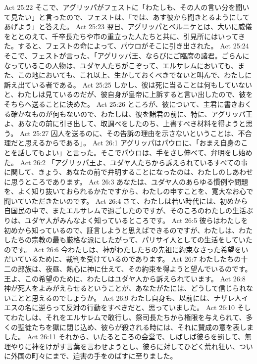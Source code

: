 Act 25:22  そこで、アグリッパがフェストに「わたしも、その人の言い分を聞いて見たい」と言ったので、フェストは、「では、あす彼から聞きとるようにしてあげよう」と答えた。
Act 25:23  翌日、アグリッパとベルニケとは、大いに威儀をととのえて、千卒長たちや市の重立った人たちと共に、引見所にはいってきた。すると、フェストの命によって、パウロがそこに引き出された。
Act 25:24  そこで、フェストが言った、「アグリッパ王、ならびにご臨席の諸君。ごらんになっているこの人物は、ユダヤ人たちがこぞって、エルサレムにおいても、また、この地においても、これ以上、生かしておくべきでないと叫んで、わたしに訴え出ている者である。
Act 25:25  しかし、彼は死に当ることは何もしていないと、わたしは見ているのだが、彼自身が皇帝に上訴すると言い出したので、彼をそちらへ送ることに決めた。
Act 25:26  ところが、彼について、主君に書きおくる確かなものが何もないので、わたしは、彼を諸君の前に、特に、アグリッパ王よ、あなたの前に引き出して、取調べをしたのち、上書すべき材料を得ようと思う。
Act 25:27  囚人を送るのに、その告訴の理由を示さないということは、不合理だと思えるからである」。
Act 26:1  アグリッパはパウロに、「おまえ自身のことを話してもよい」と言った。そこでパウロは、手をさし伸べて、弁明をし始めた。
Act 26:2  「アグリッパ王よ、ユダヤ人たちから訴えられているすべての事に関して、きょう、あなたの前で弁明することになったのは、わたしのしあわせに思うところであります。
Act 26:3  あなたは、ユダヤ人のあらゆる慣例や問題を、よく知り抜いておられるかたですから、わたしの申すことを、寛大なお心で聞いていただきたいのです。
Act 26:4  さて、わたしは若い時代には、初めから自国民の中で、またエルサレムで過ごしたのですが、そのころのわたしの生活ぶりは、ユダヤ人がみんなよく知っているところです。
Act 26:5  彼らはわたしを初めから知っているので、証言しようと思えばできるのですが、わたしは、わたしたちの宗教の最も厳格な派にしたがって、パリサイ人としての生活をしていたのです。
Act 26:6  今わたしは、神がわたしたちの先祖に約束なさった希望をいだいているために、裁判を受けているのであります。
Act 26:7  わたしたちの十二の部族は、夜昼、熱心に神に仕えて、その約束を得ようと望んでいるのです。王よ、この希望のために、わたしはユダヤ人から訴えられています。
Act 26:8  神が死人をよみがえらせるということが、あなたがたには、どうして信じられないことと思えるのでしょうか。
Act 26:9  わたし自身も、以前には、ナザレ人イエスの名に逆らって反対の行動をすべきだと、思っていました。
Act 26:10  そしてわたしは、それをエルサレムで敢行し、祭司長たちから権限を与えられて、多くの聖徒たちを獄に閉じ込め、彼らが殺される時には、それに賛成の意を表しました。
Act 26:11  それから、いたるところの会堂で、しばしば彼らを罰して、無理やりに神をけがす言葉を言わせようとし、彼らに対してひどく荒れ狂い、ついに外国の町々にまで、迫害の手をのばすに至りました。
